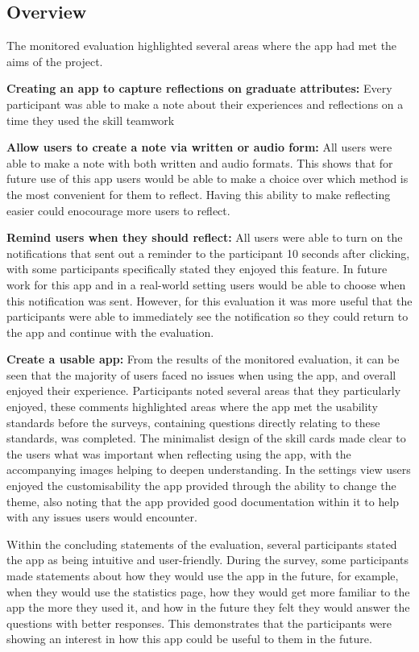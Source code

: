 \documentclass{l4proj}
\begin{document}
\subsection{Overview}

The monitored evaluation highlighted several areas where the app had met the aims of the project.

\textbf{Creating an app to capture reflections on graduate attributes:} Every participant was able to make a note about their experiences and reflections on a time they used the skill teamwork

\textbf{Allow users to create a note via written or audio form:} All users were able to make a note with both written and audio formats. This shows that for future use of this app users would be able to make a choice over which method is the most convenient for them to reflect. Having this ability to make reflecting easier could enocourage more users to reflect.
 
\textbf{Remind users when they should reflect:} All users were able to turn on the notifications that sent out a reminder to the participant 10 seconds after clicking, with some participants specifically stated they enjoyed this feature. In future work for this app and in a real-world setting users would be able to choose when this notification was sent. However, for this evaluation it was more useful that the participants were able to immediately see the notification so they could return to the app and continue with the evaluation.

\textbf{Create a usable app:} From the results of the monitored evaluation, it can be seen that the majority of users faced no issues when using the app, and overall enjoyed their experience. Participants noted several areas that they particularly enjoyed, these comments highlighted areas where the app met the usability standards before the surveys, containing questions directly relating to these standards, was completed. The minimalist design of the skill cards made clear to the users what was important when reflecting using the app, with the accompanying images helping to deepen understanding. In the settings view users enjoyed the customisability the app provided through the ability to change the theme, also noting that the app provided good documentation within it to help with any issues users would encounter.

Within the concluding statements of the evaluation, several participants stated the app as being intuitive and user-friendly. During the survey, some participants made statements about how they would use the app in the future, for example, when they would use the statistics page, how they would get more familiar to the app the more they used it, and how in the future they felt they would answer the questions with better responses. This demonstrates that the participants were showing an interest in how this app could be useful to them in the future.
\end{document}
